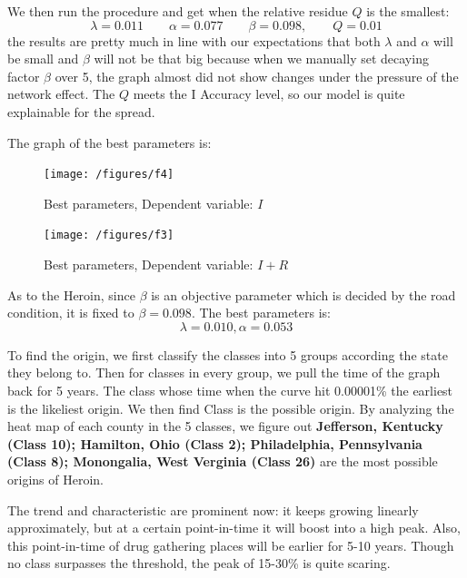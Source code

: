 \documentclass{mcmthesis}
\begin{document}
We then run the procedure and get when the relative residue $Q$ is the smallest:
$$\lambda=0.011 \qquad \alpha=0.077 \qquad \beta=0.098, \qquad Q=0.01$$ the results are pretty much in line with our expectations that both $\lambda$ and $\alpha$ will be small and $\beta$ will not be that big because when we manually set decaying factor $\beta$ over 5, the graph almost did not show changes under the pressure of the network effect. The $Q$ meets the I Accuracy level, so our model is quite explainable for the spread. 

The graph of the best parameters is:

\begin{figure}[htbp!]
  \begin{flushleft}
  	\begin{minipage}[t]{0.3\textwidth}
  \centering
  \texttt{[image: /figures/f4]}
  \caption{Best parameters, Dependent variable: $I$}
  \end{minipage}
  \qquad\qquad\qquad\qquad
  	\begin{minipage}[t]{0.3\textwidth}
  \centering
  \texttt{[image: /figures/f3]}
  \caption{Best parameters, Dependent variable: $I+R$}
  \end{minipage}
  \end{flushleft}
  
\end{figure}

As to the Heroin, since $\beta$ is an objective parameter which is decided by the road condition, it is fixed to $\beta=0.098$. The best parameters is:
$$\lambda=0.010, \alpha=0.053$$

To find the origin, we first classify the classes into 5 groups according the state they belong to. Then for classes in every group, we pull the time of the graph back for 5 years. The class whose time when the curve hit 0.00001\% the earliest is the likeliest origin. We then find Class is the possible origin. By analyzing the heat map of each county in the 5 classes, we figure out \textbf{Jefferson, Kentucky (Class 10); Hamilton, Ohio (Class 2); Philadelphia, Pennsylvania (Class 8); Monongalia, West Verginia (Class 26)} are the most possible origins of Heroin.

The trend and characteristic are prominent now: it keeps growing linearly approximately, but at a certain point-in-time it will boost into a high peak. Also, this point-in-time of drug gathering places will be earlier for 5-10 years. Though no class surpasses the threshold, the peak of 15-30\% is quite scaring.
\end{document}

